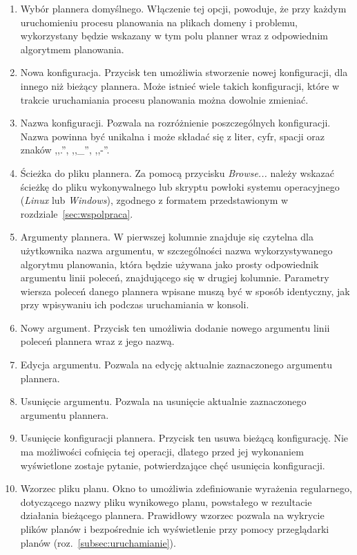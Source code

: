 \begin{enumerate}
\item Wybór plannera domyślnego. Włączenie tej opcji, powoduje, że przy każdym uruchomieniu procesu planowania na plikach domeny i problemu, wykorzystany będzie wskazany w tym polu planner wraz z odpowiednim algorytmem planowania.
\item Nowa konfiguracja. Przycisk ten umożliwia stworzenie nowej konfiguracji, dla innego niż bieżący plannera. Może istnieć wiele takich konfiguracji, które w trakcie uruchamiania procesu planowania można dowolnie zmieniać.
\item Nazwa konfiguracji. Pozwala na rozróżnienie poszczególnych konfiguracji. Nazwa powinna być unikalna i może składać się z liter, cyfr, spacji oraz znaków ,,.'', ,,\_'', ,,-''.
\item Ścieżka do pliku plannera. Za pomocą przycisku \textit{Browse...} należy wskazać ścieżkę do pliku wykonywalnego lub skryptu powłoki systemu operacyjnego (\textit{Linux} lub \textit{Windows}), zgodnego z formatem przedstawionym w rozdziale~\ref{sec:wspolpraca}.
\item Argumenty plannera. W pierwszej kolumnie znajduje się czytelna dla użytkownika nazwa argumentu, w szczególności nazwa wykorzystywanego algorytmu planowania, która będzie używana jako prosty odpowiednik argumentu linii poleceń, znajdującego się w drugiej kolumnie. Parametry wiersza poleceń danego plannera wpisane muszą być w sposób identyczny, jak przy wpisywaniu ich podczas uruchamiania w konsoli.
\item Nowy argument. Przycisk ten umożliwia dodanie nowego argumentu linii poleceń plannera wraz z jego nazwą.
\item Edycja argumentu. Pozwala na edycję aktualnie zaznaczonego argumentu plannera.
\item Usunięcie argumentu. Pozwala na usunięcie aktualnie zaznaczonego argumentu plannera.
\item Usunięcie konfiguracji plannera. Przycisk ten usuwa bieżącą konfigurację. Nie ma możliwości cofnięcia tej operacji, dlatego przed jej wykonaniem wyświetlone zostaje pytanie, potwierdzające chęć usunięcia konfiguracji.
\item Wzorzec pliku planu. Okno to umożliwia zdefiniowanie wyrażenia regularnego, dotyczącego nazwy pliku wynikowego planu, powstałego w rezultacie działania bieżącego plannera. Prawidłowy wzorzec pozwala na wykrycie plików planów i bezpośrednie ich wyświetlenie przy pomocy przeglądarki planów (roz.~\ref{subsec:uruchamianie}).

\end{enumerate}
